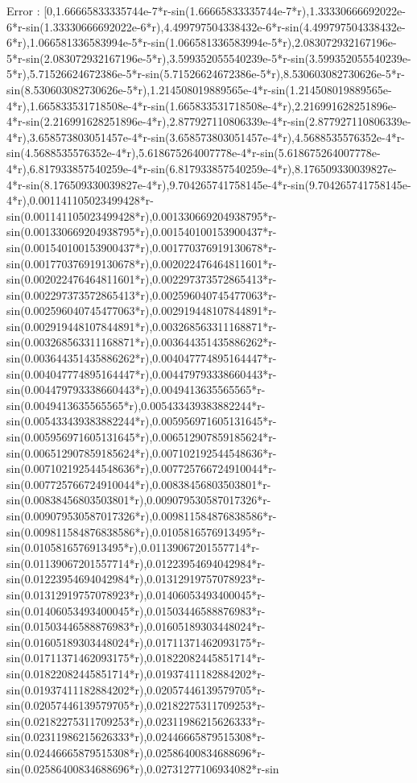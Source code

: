 \documentclass[12pt,arial,letterpaper]{book}
\begin{document}
\begin{eulernootebook}
\begin{eulercomment}
\begin{eulercomment}
\begin{eulernootebook}
\begin{eulercomment}
\begin{eulercomment}
\begin{eulercomment}
\begin{eulercomment}
\begin{eulercomment}
\begin{eulercomment}
\begin{eulernotebook}
\begin{eulercomment}
\begin{eulercomment}
\begin{eulercomment}
\begin{eulercomment}
\begin{eulercomment}
\begin{eulercomment}
\begin{eulercomment}
\begin{eulercomment}
\begin{eulercomment}
\begin{eulercomment}
\begin{eulercomment}
\begin{eulercomment}
\begin{eulercomment}
\begin{eulercomment}
\begin{eulercomment}
\begin{eulercomment}
\begin{euleroutput}
  Error : [0,1.66665833335744e-7*r-sin(1.66665833335744e-7*r),1.33330666692022e-6*r-sin(1.33330666692022e-6*r),4.499797504338432e-6*r-sin(4.499797504338432e-6*r),1.066581336583994e-5*r-sin(1.066581336583994e-5*r),2.083072932167196e-5*r-sin(2.083072932167196e-5*r),3.599352055540239e-5*r-sin(3.599352055540239e-5*r),5.71526624672386e-5*r-sin(5.71526624672386e-5*r),8.530603082730626e-5*r-sin(8.530603082730626e-5*r),1.214508019889565e-4*r-sin(1.214508019889565e-4*r),1.665833531718508e-4*r-sin(1.665833531718508e-4*r),2.216991628251896e-4*r-sin(2.216991628251896e-4*r),2.877927110806339e-4*r-sin(2.877927110806339e-4*r),3.658573803051457e-4*r-sin(3.658573803051457e-4*r),4.5688535576352e-4*r-sin(4.5688535576352e-4*r),5.618675264007778e-4*r-sin(5.618675264007778e-4*r),6.817933857540259e-4*r-sin(6.817933857540259e-4*r),8.176509330039827e-4*r-sin(8.176509330039827e-4*r),9.704265741758145e-4*r-sin(9.704265741758145e-4*r),0.001141105023499428*r-sin(0.001141105023499428*r),0.001330669204938795*r-sin(0.001330669204938795*r),0.001540100153900437*r-sin(0.001540100153900437*r),0.001770376919130678*r-sin(0.001770376919130678*r),0.002022476464811601*r-sin(0.002022476464811601*r),0.002297373572865413*r-sin(0.002297373572865413*r),0.002596040745477063*r-sin(0.002596040745477063*r),0.002919448107844891*r-sin(0.002919448107844891*r),0.003268563311168871*r-sin(0.003268563311168871*r),0.003644351435886262*r-sin(0.003644351435886262*r),0.004047774895164447*r-sin(0.004047774895164447*r),0.004479793338660443*r-sin(0.004479793338660443*r),0.0049413635565565*r-sin(0.0049413635565565*r),0.005433439383882244*r-sin(0.005433439383882244*r),0.005956971605131645*r-sin(0.005956971605131645*r),0.006512907859185624*r-sin(0.006512907859185624*r),0.007102192544548636*r-sin(0.007102192544548636*r),0.007725766724910044*r-sin(0.007725766724910044*r),0.00838456803503801*r-sin(0.00838456803503801*r),0.009079530587017326*r-sin(0.009079530587017326*r),0.009811584876838586*r-sin(0.009811584876838586*r),0.0105816576913495*r-sin(0.0105816576913495*r),0.01139067201557714*r-sin(0.01139067201557714*r),0.01223954694042984*r-sin(0.01223954694042984*r),0.01312919757078923*r-sin(0.01312919757078923*r),0.01406053493400045*r-sin(0.01406053493400045*r),0.01503446588876983*r-sin(0.01503446588876983*r),0.01605189303448024*r-sin(0.01605189303448024*r),0.01711371462093175*r-sin(0.01711371462093175*r),0.01822082445851714*r-sin(0.01822082445851714*r),0.01937411182884202*r-sin(0.01937411182884202*r),0.02057446139579705*r-sin(0.02057446139579705*r),0.02182275311709253*r-sin(0.02182275311709253*r),0.02311986215626333*r-sin(0.02311986215626333*r),0.02446665879515308*r-sin(0.02446665879515308*r),0.02586400834688696*r-sin(0.02586400834688696*r),0.02731277106934082*r-sin
\end{euleroutput}
\end{eulercomment}
\end{eulercomment}
\end{eulercomment}
\end{eulercomment}
\end{eulercomment}
\end{eulercomment}
\end{eulercomment}
\end{eulercomment}
\end{eulercomment}
\end{eulercomment}
\end{eulercomment}
\end{eulercomment}
\end{eulercomment}
\end{eulercomment}
\end{eulercomment}
\end{eulercomment}
\end{eulernotebook}
\end{eulercomment}
\end{eulercomment}
\end{eulercomment}
\end{eulercomment}
\end{eulercomment}
\end{eulercomment}
\end{eulernootebook}
\end{eulercomment}
\end{eulercomment}
\end{eulernootebook}
\end{document}
